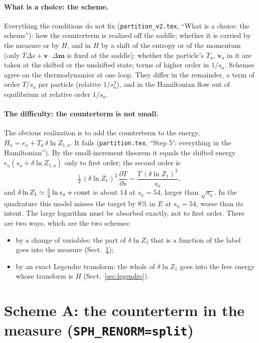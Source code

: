 \documentclass[11pt,aps,preprint,nofootinbib,superscriptaddress,tightenlines]{revtex4-2}
\def\st{\begin{equation}}
\def\stp{\end{equation}}
\def\Sect#1{Sect.~\ref{#1}}
\let\oldparagraph\paragraph
\renewcommand{\paragraph}{\par\bigskip\oldparagraph}
\begin{document}
\paragraph{What is a choice: the scheme.}  Everything the conditions do not fix (\nolinkurl{partition_v2.tex}, ``What is a choice: the scheme''):
how the counterterm is realized off the saddle; whether it is carried by the measure or by $H$, and in $H$ by a shift of the entropy or of the
momentum (only $T\Delta s+\bm v\cdot\Delta\bm m$ is fixed at the saddle); whether the particle's $T_a$, $\bm v_a$ in it are taken at the shifted or the
unshifted state; terms of higher order in $1/s_a$.  Schemes agree on the thermodynamics at one loop.  They differ in the remainder, a term of
order $T/s_a$ per particle (relative $1/s_a^2$), and in the Hamiltonian flow out of equilibrium at relative order $1/s_a$.

\paragraph{The difficulty: the counterterm is not small.}  The obvious realization is to add the counterterm to the energy,
$H_a=e_a+T_a\,\delta\ln Z_{1,a}$.  It fails (\nolinkurl{partition.tex}, ``Step 5$'$: everything in the Hamiltonian'').  By the small-increment theorem it
equals the shifted energy $e_a(s_a+\delta\ln Z_{1,a})$ only to first order; the second order is
\st
\tfrac12\,(\delta\ln Z_1)^2\,\frac{\partial T}{\partial s}\sim\frac{T\,(\delta\ln Z_1)^2}{s_a} ,
\stp
and $\delta\ln Z_1\simeq\tfrac52\ln s_a+{\rm const}$ is about $14$ at $s_a=54$, larger than $\sqrt{s_a}$.  In the quadrature this model misses the target
by $8\%$ in $E$ at $s_a=54$, worse than its intent.  The large logarithm must be absorbed exactly, not to first order.  There are two ways,
which are the two schemes:
\begin{itemize}
\item[A.] by a change of variables: the part of $\delta\ln Z_1$ that is a function of the label goes into the measure (\Sect{sec:split});
\item[B.] by an exact Legendre transform: the whole of $\delta\ln Z_1$ goes into the free energy whose transform is $H$ (\Sect{sec:legendre}).
\end{itemize}

\section{Scheme A: the counterterm in the measure (\texttt{SPH\_RENORM=split})}
\label{sec:split}
\end{document}
